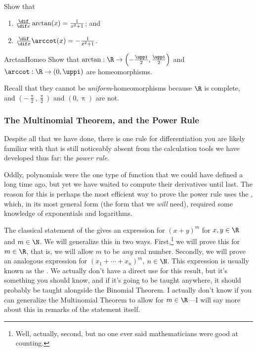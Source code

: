 \begin{exr}{}{}
Show that
\begin{enumerate}
\item $\frac{\dif}{\dif x}\arctan (x)=\frac{1}{x^2+1}$; and
\item $\frac{\dif}{\dif x}\arccot (x)=-\frac{1}{x^2+1}$.
\end{enumerate}
\end{exr}
\begin{exr}{}{ArctanHomeo}
Show that $\arctan :\R \rightarrow \left( -\frac{\uppi}{2},\frac{\uppi}{2}\right)$ and $\arccot :\R \rightarrow (0,\uppi )$ are homeomorphisms.
\begin{rmk}
Recall that they cannot be \emph{uniform}-homeomorphisms because $\R$ is complete, and $\left( -\frac{\uppi}{2},\frac{\uppi}{2}\right)$ and $(0,\uppi )$ are not.
\end{rmk}
\end{exr}

\subsubsection{The Multinomial Theorem, and the Power Rule}

Despite all that we have done, there is one rule for differentiation you are likely familiar with that is still noticeably absent from the calculation tools we have developed thus far:  the \emph{power rule}.

Oddly, polynomials were the one type of function that we could have defined a long time ago, but yet we have waited to compute their derivatives until last.  The reason for this is perhaps the most efficient way to prove the power rule uses the \emph{}, which, in its most general form (the form that we \emph{will} need), required some knowledge of exponentials and logarithms.

The classical statement of the  gives an expression for $(x+y)^m$ for $x,y\in \R$ and $m\in \N$.  We will generalize this in two ways.  First,\footnote{Well, actually, second, but no one ever said mathematicians were good at counting.} we will prove this for $m\in \R$, that is, we will allow $m$ to be \emph{any} real number.  Secondly, we will prove an analogous expression for $(x_1+\cdots +x_n)^m$, $n\in \N$.  This expression is usually known as the \emph{}.  We actually don't have a direct use for this result, but it's something you should know, and if it's going to be taught anywhere, it should probably be taught alongside the Binomial Theorem.  I actually don't know if you can generalize the Multinomial Theorem to allow for $m\in \R$---I will say more about this in remarks of the statement itself.

